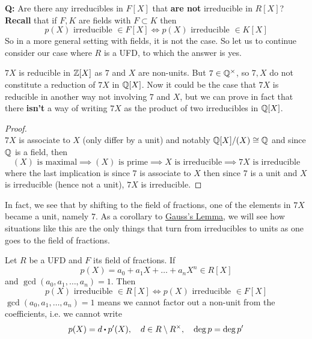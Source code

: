 \documentclass[../Main.tex]{subfiles}
\begin{document}
\textbf{Q:} Are there any irreducibles in $F[X]$ that \textbf{are not} irreducible in $R[X]$?\\
\textbf{Recall} that if $F,K$ are fields with $F\subset K$ then \[p(X) \text{ irreducible } \in F[X] \Longleftrightarrow p(X) \text{ irreducible }\in K[X]\]
So in a more general setting with fields, it is not the case. So let us to continue consider our case where $R$ is a UFD, to which the answer is yes.
\begin{example}
	$7X$ is reducible in $\mathbb{Z}[X]$ as $7$ and $X$ are non-units. But $7\in \mathbb{Q}^\times$, so $7,X$ do not constitute a reduction of $7X$ in $\mathbb{Q}[X]$. Now it could be the case that $7X$ is reducible in another way not involving $7$ and $X$, but we can prove in fact that there \textbf{isn't} a way of writing $7X$ as the product of two irreducibles in $\mathbb{Q}[X]$.
	\begin{proof}~\\ $7X$ is associate to $X$ (only differ by a unit) and notably $\mathbb{Q}[X]/(X)\cong \mathbb{Q}$ and since $\mathbb{Q}$ is a field, then
	\[ (X) \text{ is maximal}\implies (X) \text{ is prime}\implies X\text{ is irreducible}\implies 7X\text{ is irreducible}\]
	where the last implication is since $7$ is associate to $X$ then since $7$ is a unit and $X$ is irreducible (hence not a unit), $7X$ is irreducible.
	\end{proof}
\end{example}
In fact, we see that by shifting to the field of fractions, one of the elements in $7X$ became a unit, namely $7$. As a corollary to \hyperref[lem:gauss]{Gauss's Lemma}, we will see how situations like this are the only things that turn from irreducibles to units as one goes to the field of fractions. 
\begin{crl}[label=13.2]
	Let $R$ be a UFD and $F$ its field of fractions. If
	\[p(X)=a_0+a_1X+\dots+a_nX^n \in R[X]\]
	and $\gcd(a_0,a_1,\dots,a_n)=1$. Then
	\[p(X) \text{ irreducible }\in R[X] \Longleftrightarrow p(X) \text{ irreducible }\in F[X]\]
	\Note $\gcd(a_0,a_1,\dots,a_n)=1$ means we cannot factor out a non-unit from the coefficients, i.e. we cannot write
	\[p(X)=d\rdot p'(X),\quad d\in R\setminus R^\times, \quad \deg p =\deg p'\] 
\end{crl}
\end{document}

